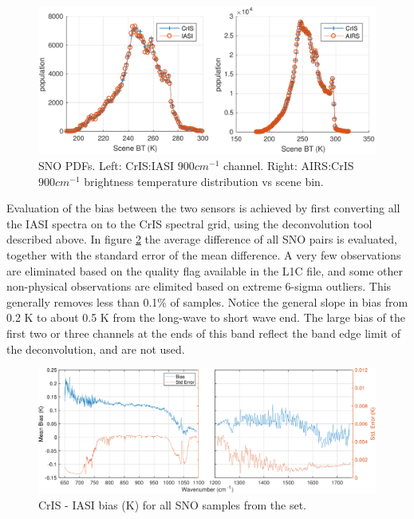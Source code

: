 \documentclass[twocolumn,10pt]{article}
\begin{document}
\begin{figure}[htb]
\centering
\includegraphics[width=\linewidth]{./figs/AC_IC_jplSNO_900wn_hist.pdf}
\caption{
  SNO PDFs. Left: CrIS:IASI $900 cm^{-1}$ channel. Right: AIRS:CrIS $900 cm^{-1}$ brightness temperature distribution vs scene bin.}
\label{fig:X2}
\end{figure}

Evaluation of the bias between the two sensors is achieved by first converting all the
IASI spectra on to the CrIS spectral grid, using the deconvolution tool described above.
In figure \ref{fig:X3} the average difference of all SNO pairs
is evaluated, together with the standard error of the mean difference. A very few
observations are eliminated based on the quality flag available in the L1C file, and some other non-physical observations are elimited based on extreme 6-sigma outliers. This generally removes less than  0.1\%  of samples. Notice the general slope in bias from 0.2 K to about 0.5 K from the long-wave to short wave end. The large bias of the first two or three channels at the ends of this band reflect the band edge limit of the deconvolution, and are not used.

\begin{figure}[htb]
  \centering
  \includegraphics[width=\linewidth]{./figs/fig5.pdf} 
  \caption{CrIS - IASI bias (K) for all SNO samples from the set.}
  \label{fig:X3}
\end{figure}
\end{document}
